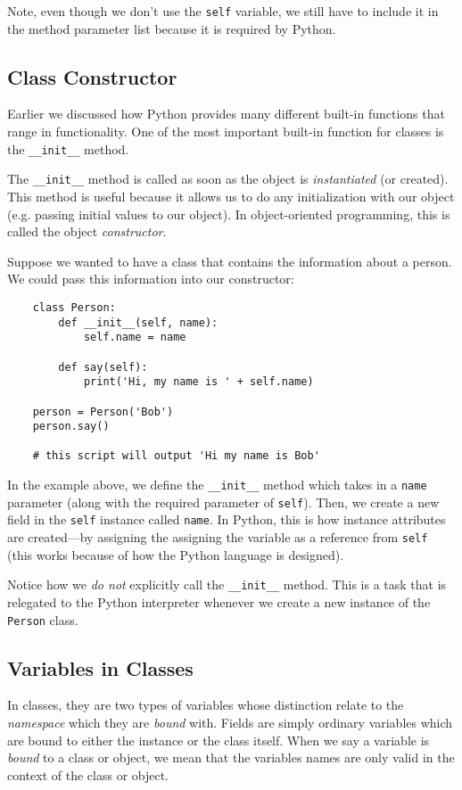 \documentclass{cslesson}
\begin{document}
Note, even though we don't use the \texttt{self} variable, we still have to include it in the method parameter list because it is required by Python.

\subsection{Class Constructor}
Earlier we discussed how Python provides many different built-in functions that range in functionality. One of the most important built-in function for classes
is the \texttt{\_\_init\_\_} method.

The \texttt{\_\_init\_\_} method is called as soon as the object is \textit{instantiated} (or created). This method is useful because it allows us to do
any initialization with our object (e.g. passing initial values to our object). In object-oriented programming, this is called the object \textit{constructor}.

Suppose we wanted to have a class that contains the information about a person. We could pass this information into our constructor:

\begin{verbatim}
    class Person:
        def __init__(self, name):
            self.name = name

        def say(self):
            print('Hi, my name is ' + self.name)

    person = Person('Bob')
    person.say()

    # this script will output 'Hi my name is Bob'
\end{verbatim}

In the example above, we define the \texttt{\_\_init\_\_} method which takes in a \texttt{name} parameter (along with the required parameter of \texttt{self}).
Then, we create a new field in the \texttt{self} instance called \texttt{name}. In Python, this is how instance attributes are created---by assigning the
assigning the variable as a reference from \texttt{self} (this works because of how the Python language is designed).

Notice how we \textit{do not} explicitly call the \texttt{\_\_init\_\_} method. This is a task that is relegated to the Python interpreter whenever we create
a new instance of the \texttt{Person} class.

\subsection{Variables in Classes}
In classes, they are two types of variables whose distinction relate to the \textit{namespace} 
which they are \textit{bound} with. Fields are simply ordinary variables which are bound to either
the instance or the class itself. When we say a variable is \textit{bound} to a class or object, we mean that the
variables names are only valid in the context of the class or object.
\end{document}
